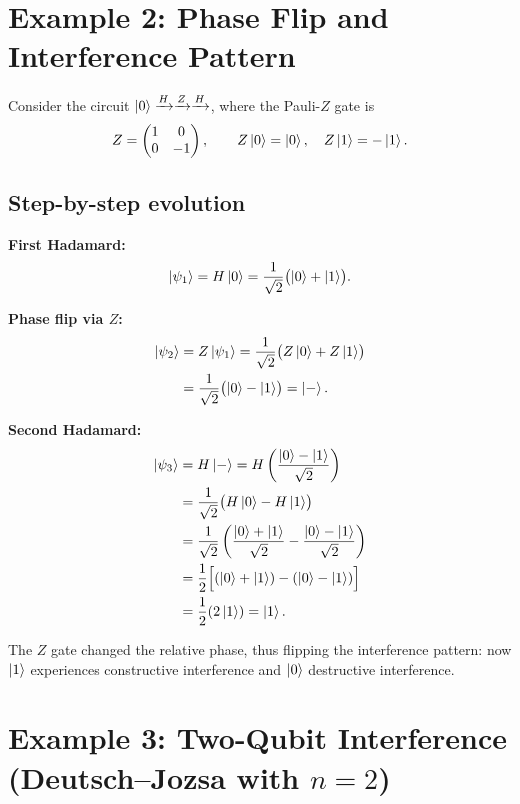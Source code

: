 \documentclass[a4paper,11pt]{article}
\providecommand{\ket}[1]{\mathinner{|{#1}\rangle}}
\begin{document}
\section*{Example 2: Phase Flip and Interference Pattern}

Consider the circuit $\ket{0} \xrightarrow{H} \xrightarrow{Z} \xrightarrow{H}$, where the
Pauli-$Z$ gate is
\begin{equation}
  Z =
  \begin{pmatrix}
    1 & 0 \\
    0 & -1
  \end{pmatrix},
  \qquad Z\ket{0} = \ket{0}, \quad Z\ket{1} = -\ket{1}.
\end{equation}

\subsection*{Step-by-step evolution}

\textbf{First Hadamard:}
\begin{equation}
  \ket{\psi_1} = H\ket{0} = \frac{1}{\sqrt{2}}\bigl(\ket{0} + \ket{1}\bigr).
\end{equation}

\textbf{Phase flip via $Z$:}
\begin{align}
  \ket{\psi_2} &= Z\ket{\psi_1} = \frac{1}{\sqrt{2}}\bigl(Z\ket{0} + Z\ket{1}\bigr) \\
  &= \frac{1}{\sqrt{2}}\bigl(\ket{0} - \ket{1}\bigr) = \ket{-}.
\end{align}

\textbf{Second Hadamard:}
\begin{align}
  \ket{\psi_3} &= H\ket{-} = H\left(\frac{\ket{0} - \ket{1}}{\sqrt{2}}\right) \\
  &= \frac{1}{\sqrt{2}}\bigl(H\ket{0} - H\ket{1}\bigr) \\
  &= \frac{1}{\sqrt{2}}\left(\frac{\ket{0} + \ket{1}}{\sqrt{2}}
     - \frac{\ket{0} - \ket{1}}{\sqrt{2}}\right) \\
  &= \frac{1}{2}\Bigl[(\ket{0} + \ket{1}) - (\ket{0} - \ket{1})\Bigr] \\
  &= \frac{1}{2}(2\ket{1}) = \ket{1}.
\end{align}

The $Z$ gate changed the relative phase, thus flipping the interference pattern: now $\ket{1}$
experiences constructive interference and $\ket{0}$ destructive interference.

\section*{Example 3: Two-Qubit Interference (Deutsch--Jozsa with $n = 2$)}
\end{document}
